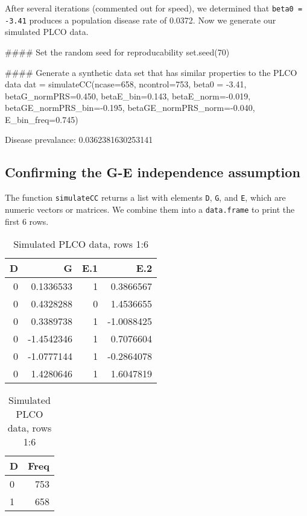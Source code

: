 \documentclass{article}\usepackage[]{graphicx}\usepackage[]{color}
\def\code#1{\texttt{#1}}
\begin{document}
After several iterations (commented out for speed), we determined that \code{beta0 = -3.41} produces a population disease rate of 0.0372.  Now we generate our simulated PLCO data.
\begin{Schunk}
\begin{Sinput}
#### Set the random seed for reproducability
set.seed(70)

#### Generate a synthetic data set that has similar properties to the PLCO data
dat = simulateCC(ncase=658, ncontrol=753, beta0 = -3.41, betaG_normPRS=0.450,
                 betaE_bin=0.143, betaE_norm=-0.019, betaGE_normPRS_bin=-0.195,
                 betaGE_normPRS_norm=-0.040, E_bin_freq=0.745)
\end{Sinput}
\begin{Soutput}

Disease prevalance: 0.0362381630253141 
\end{Soutput}
\end{Schunk}

\subsection{Confirming the G-E independence assumption}

The function \code{simulateCC} returns a list with elements \code{D}, \code{G}, and \code{E}, which are numeric vectors or matrices.  We combine them into a \code{data.frame} to print the first 6 rows.
\begin{Schunk}
\begin{table}
\caption{\label{tab:unnamed-chunk-3}Simulated PLCO data, rows 1:6}

\centering
\begin{tabular}[t]{r|r|r|r}
\hline
D & G & E.1 & E.2\\
\hline
0 & 0.1336533 & 1 & 0.3866567\\
\hline
0 & 0.4328288 & 0 & 1.4536655\\
\hline
0 & 0.3389738 & 1 & -1.0088425\\
\hline
0 & -1.4542346 & 1 & 0.7076604\\
\hline
0 & -1.0777144 & 1 & -0.2864078\\
\hline
0 & 1.4280646 & 1 & 1.6047819\\
\hline
\end{tabular}
\centering
\begin{tabular}[t]{l|r}
\hline
D & Freq\\
\hline
0 & 753\\
\hline
1 & 658\\
\hline
\end{tabular}
\end{table}

\end{Schunk}
\end{document}
